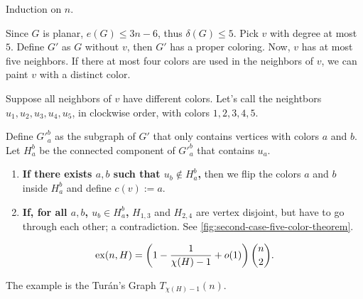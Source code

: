 \begin{dem}
	Induction on $n$.

	Since $G$ is planar, $e(G) \le 3n - 6$, thus $\delta(G) \le 5$. Pick $v$ with degree at most $5$. 
	Define $G'$ as $G$ without $v$, then $G'$ has a proper coloring. Now, $v$ has at most five neighbors. If there at most four colors are used in the neighbors of $v$, we can paint $v$ with a distinct color.

	Suppose all neighbors of $v$ have different colors. Let's call the neightbors $u_1, u_2, u_3, u_4, u_5$, in clockwise order, with colors $1, 2, 3, 4, 5$.

	Define $\left.G'\right._a^b$ as the subgraph of $G'$ that only contains vertices with colors $a$ and $b$. Let $H_a^b$ be the connected component of $\left.G'\right._a^b$ that contains $u_a$.
	\begin{enumerate}[label = \textbullet]
		\item \textbf{\boldmath If there exists $a, b$ such that $u_b \not\in H_a^b$,} then we flip the colors $a$ and $b$ inside $H_a^b$ and define $c(v) := a$.
		\item \textbf{\boldmath If, for all $a, b$, $u_b \in H_a^b$,} $H_{1, 3}$ and $H_{2, 4}$ are vertex disjoint, but have to go through each other; a contradiction. See \cref{fig:second-case-five-color-theorem}.
	\end{enumerate}
\end{dem}


\begin{thm}
	\[
		\operatorname{ex}(n, H) = \left(1 - \frac{1}{\chi(H) - 1} + o(1)\right)\binom{n}{2}.
	\]
\end{thm}

\begin{sk}
	The example is the Turán's Graph $T_{\chi(H)-1}(n)$.
\end{sk}
